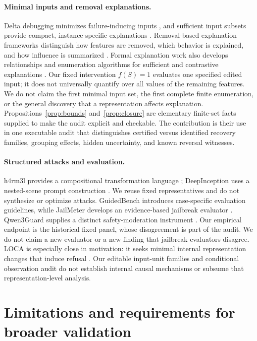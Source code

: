 \documentclass{article}
\begin{document}
\paragraph{Minimal inputs and removal explanations.}
Delta debugging minimizes failure-inducing inputs \citep{zeller2002}, and
sufficient input subsets provide compact, instance-specific explanations
\citep{carter2019}. Removal-based explanation frameworks distinguish how
features are removed, which behavior is explained, and how influence is
summarized \citep{covert2021}. Formal explanation work also develops
relationships and enumeration algorithms for sufficient and contrastive
explanations \citep{ignatiev2020}. Our fixed intervention $f(S)=1$ evaluates
one specified edited input; it does not universally quantify over all values
of the remaining features. We do not claim the first minimal input set,
the first complete finite enumeration, or the general discovery that a
representation affects explanation. Propositions~\ref{prop:bounds}
and~\ref{prop:closure} are elementary finite-set facts supplied to make the
audit explicit and checkable. The contribution is their use in one executable
audit that distinguishes certified versus identified recovery families,
grouping effects, hidden uncertainty, and known reversal witnesses.

\paragraph{Structured attacks and evaluation.}
h4rm3l provides a compositional transformation language
\citep{doumbouya2025}; DeepInception uses a nested-scene prompt construction
\citep{li2023}. We reuse fixed representatives and do not synthesize or
optimize attacks. GuidedBench introduces case-specific evaluation guidelines,
while JailMeter develops an evidence-based jailbreak evaluator
\citep{huang2026guidedbench,huang2026jailmeter}. Qwen3Guard supplies a distinct
safety-moderation instrument \citep{zhao2025}. Our empirical endpoint is the
historical fixed panel, whose disagreement is part of the audit. We do not
claim a new evaluator or a new finding that jailbreak evaluators disagree.
LOCA is especially close in motivation: it seeks minimal internal
representation changes that induce refusal \citep{kumar2026}. Our editable
input-unit families and conditional observation audit do not establish
internal causal mechanisms or subsume that representation-level analysis.

\section{Limitations and requirements for broader validation}
\end{document}
